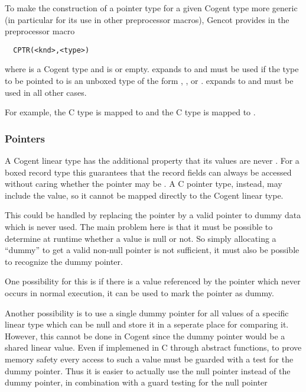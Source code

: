 To make the construction of a pointer type for a given Cogent type more generic (in particular for its use 
in other preprocessor macros), Gencot provides in  the preprocessor macro
\begin{verbatim}
  CPTR(<knd>,<type>)
\end{verbatim}
where  is a Cogent type and  is  or empty.  expands to  and
must be used if the type to be pointed to is an unboxed type of the form , , or
.  expands to  and must be used in all other cases.

For example, the C type  is mapped to  and the C type  is mapped
to .

\subsubsection{ Pointers}

A Cogent linear type has the additional property that its values are never . For a boxed record type this
guarantees that the record fields can always be accessed without caring whether the pointer may be .
A C pointer type, instead, may include the  value, so it cannot be mapped directly to the Cogent linear type.

This could be handled by replacing the  pointer by a valid pointer to dummy data which is never used.
The main problem here is that it must be possible to determine at runtime whether a value is null or not. So simply
allocating a ``dummy'' to get a valid non-null pointer is not sufficient, it must also be possible to recognize the 
dummy pointer.

One possibility for this is if there is a value referenced by the pointer which never occurs in normal execution,
it can be used to mark the pointer as dummy. 

Another possibility is to use a single dummy pointer for all values of a specific linear type which can be null and store it 
in a seperate place for comparing it. However, this cannot be done in Cogent since the dummy pointer would be a shared linear 
value. Even if implemened in C through abstract functions, to prove memory safety every access to such a value must 
be guarded with a test for the dummy pointer. Thus it is easier to actually use the null pointer instead of the dummy pointer,
in combination with a guard testing for the null pointer


